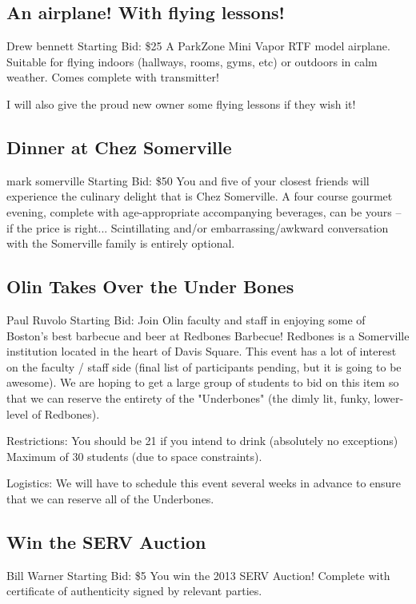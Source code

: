 \documentclass[11pt]{article}
\begin{document}
\subsection{An airplane!  With flying lessons!}
Drew bennett
\newline
Starting Bid: \$25
\newline
A ParkZone Mini Vapor RTF model airplane. Suitable for flying indoors (hallways, rooms, gyms, etc) or outdoors in calm weather.  Comes complete with transmitter!

I will also give the proud new owner some flying lessons if they wish it!

\subsection{Dinner at Chez Somerville}
mark somerville
\newline
Starting Bid: \$50
\newline
You and five of your closest friends will experience the culinary delight that is Chez Somerville.  A four course gourmet evening, complete with age-appropriate accompanying beverages, can be yours -- if the price is right... Scintillating and/or embarrassing/awkward conversation with the Somerville family is entirely optional.  
\subsection{Olin Takes Over the Under Bones}
Paul Ruvolo
\newline
Starting Bid: 
\newline
Join Olin faculty and staff in enjoying some of Boston's best barbecue and beer at Redbones Barbecue!  Redbones is a Somerville institution located in the heart of Davis Square.  This event has a lot of interest on the faculty / staff side (final list of participants pending, but it is going to be awesome).  We are hoping to get a large group of students to bid on this item so that we can reserve the entirety of the "Underbones" (the dimly lit, funky, lower-level of Redbones).

Restrictions:
You should be 21 if you intend to drink (absolutely no exceptions)
Maximum of 30 students (due to space constraints).

Logistics:
We will have to schedule this event several weeks in advance to ensure that we can reserve all of the Underbones.
\subsection{Win the SERV Auction}
Bill Warner
\newline
Starting Bid: \$5
\newline
You win the 2013 SERV Auction! Complete with certificate of authenticity signed by relevant parties.
\end{document}

